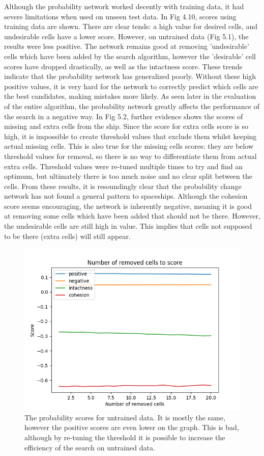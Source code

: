 \documentclass{l4proj}
\begin{document}
Although the probability network worked decently with training data, it had severe limitations when used on unseen test data. In Fig 4.10, scores using training data are shown. There are clear tends: a high value for desired cells, and undesirable cells have a lower score. However, on untrained data (Fig 5.1), the results were less positive. The network remains good at removing 'undesirable' cells which have been added by the search algorithm, however the 'desirable' cell scores have dropped drastically, as well as the intactness score. These trends indicate that the probability network has generalized poorly. Without these high positive values, it is very hard for the network to correctly predict which cells are the best candidates, making mistakes more likely. As seen later in the evaluation of the entire algorithm, the probability network greatly affects the performance of the search in a negative way. In Fig 5.2, further evidence shows the scores of missing and extra cells from the ship. Since the score for extra cells score is so high, it is impossible to create threshold values that exclude them whilst keeping actual missing cells. This is also true for the missing cells scores: they are below threshold values for removal, so there is no way to differentiate them from actual extra cells. Threshold values were re-tuned multiple times to try and find an optimum, but ultimately there is too much noise and no clear split between the cells. From these results, it is resoundingly clear that the probability change network has not found a general pattern to spaceships. Although the cohesion score seems encouraging, the network is inherently negative, meaning it is good at removing some cells which have been added that should not be there. However, the undesirable cells are still high in value. This implies that cells not supposed to be there (extra cells) will still appear.


\begin{figure}[h!]
\centering
\includegraphics[width=0.7\linewidth]{dissertation/images/graphs/n_removed_cells_score_probability_analysis_test.png}
\caption{The probability scores for untrained data. It is mostly the same, however the positive scores are even lower on the graph. This is bad, although by re-tuning the threshold it is possible to increase the efficiency of the search on untrained data.}
\label{fig:subim1}
\end{figure}
\end{document}

